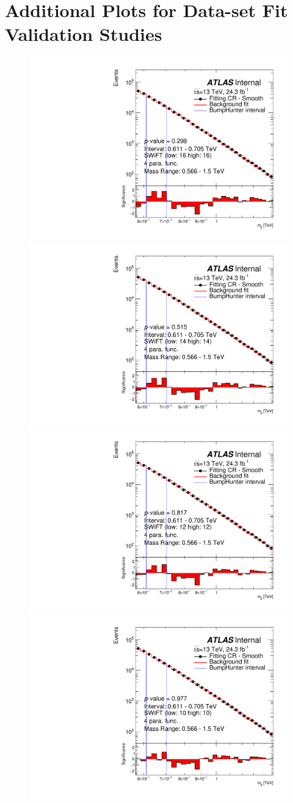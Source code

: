 \chapter{Additional Plots for \lm{} Data-set Fit Validation Studies}
\label{app:lowMass_Swift}
\vspace{-3em}

\begin{figure}[!htb]
\captionsetup[subfigure]{aboveskip=0pt,justification=centering}
\centering
{} {
  \includegraphics[width=0.3\linewidth, angle=0]{figs/Dibjet/LowMass/FitStudy_min566/bhFit_corrFitCR_smooth_4para_low16_high16.pdf}
}
 {
  \includegraphics[width=0.3\linewidth, angle=0]{figs/Dibjet/LowMass/FitStudy_min566/bhFit_corrFitCR_smooth_4para_low14_high14.pdf}
}
 {
  \includegraphics[width=0.3\linewidth, angle=0]{figs/Dibjet/LowMass/FitStudy_min566/bhFit_corrFitCR_smooth_4para_low12_high12.pdf}
}
 {
  \includegraphics[width=0.3\linewidth, angle=0]{figs/Dibjet/LowMass/FitStudy_min566/bhFit_corrFitCR_smooth_4para_low10_high10.pdf}
}
\end{figure}
